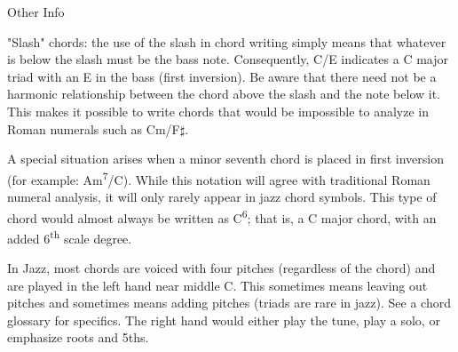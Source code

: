 \documentclass[letterpaper]{article}
\begin{document}
\Large

Other Info

\normalsize

"Slash" chords: the use of the slash in chord writing simply means that whatever is below the slash must be the bass note. Consequently, C/E indicates a C major triad with an E in the bass (first inversion). Be aware that there need not be a harmonic relationship between the chord above the slash and the note below it. This makes it possible to write chords that would be impossible to analyze in Roman numerals such as Cm/F$\sharp$.

A special situation arises when a minor seventh chord is placed in first inversion (for example: Am\textsuperscript{7}/C). While this notation will agree with traditional Roman numeral analysis, it will only rarely appear in jazz chord symbols. This type of chord would almost always be written as C\textsuperscript{6}; that is, a C major chord, with an added 6\textsuperscript{th} scale degree.

In Jazz, most chords are voiced with four pitches (regardless of the chord) and are played in the left hand near middle C. This sometimes means leaving out pitches and sometimes means adding pitches (triads are rare in jazz). See a chord glossary for specifics. The right hand would either play the tune, play a solo, or emphasize roots and 5ths.
\end{document}
